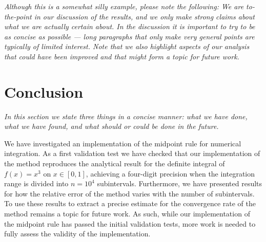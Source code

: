 \documentclass[english,notitlepage,reprint,nofootinbib]{revtex4-1}  %
\begin{document}
	\textit{Although this is a somewhat silly example, please note the following: We are to-the-point in our discussion of the results, and we only make strong claims about what we are actually certain about. In the discussion it is important to try to be as concise as possible --- long paragraphs that only make very general points are typically of limited interest. Note that we also highlight aspects of our analysis that could have been improved and that might form a topic for future work.}
	
	
	\section{Conclusion}\label{sec:conclusion}
	\textit{In this section we state three things in a concise manner: what we have done, what we have found, and what should or could be done in the future.}
	
	We have investigated an implementation of the midpoint rule for numerical integration. As a first validation test we have checked that our implementation of the method reproduces the analytical result for the definite integral of $f(x) = x^3$ on $x \in [0,1]$, achieving a four-digit precision when the integration range is divided into $n=10^4$ subintervals. Furthermore, we have presented results for how the relative error of the method varies with the number of subintervals. To use these results to extract a precise estimate for the convergence rate of the method remains a topic for future work. As such, while our implementation of the midpoint rule has passed the initial validation tests, more work is needed to fully assess the validity of the implementation.
	
	\onecolumngrid
	
	
	
	
\end{document}
